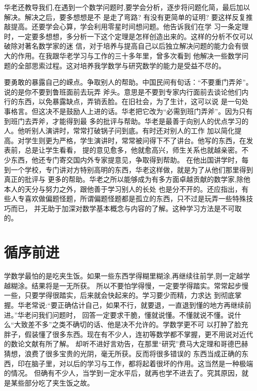 \documentclass[twoside,openright,headings=optiontohead]{ctexbook} %
\begin{document}
{华老还教导我们,在遇到一个数学问题时,要学会分析，逐步将问题化简，最后加以解决。解决之后，要多想想是不
是走了弯路? 有没有更简单的证明? 要这样反复推敲提高。还要学会心算，学会利用零星时间想问题。他告诉我们在学
习一条定理时，一定要多想想，多分析一下这个定理是怎样创造出来的。这样的分析不仅可以破除对著名数学家的迷
信，对于培养与提高自己以后独立解决问题的能力会有很大的作用。在我跟华老学习与工作的三十多年里，曾多次看到
他解决一些数学问题的全部思索过程。这对培养我学数学与研究数学的能力是受益不尽的。

要勇敢的暴露自己的嵘点。争取别人的帮助。中国民间有旬话：``不要重门弄斧''。说的是你不要到鲁班面前去玩弄
斧头。意思是不要到专家内行面前去谈论他们内行的东西，以免暴露缺点，弄销丢脸。在旧社会，为了生计，这可以说
是一句处事格言。但这决不是鼓励人上进的话。华老把它改为``必需到班门弄斧''。因为只有到班门去弄斧，才能得到最
多的批评与帮助。华老是最善于向别人的优点学习的人。他听别人演讲时，常常打破锅子问到底。有时还对别人的工作
加以简化提高。对学生则更为严格，学生演讲时，常常被问得下不了讲台。他写的东西，在发表前，总是让学生看看，
提的意见愈多，他就愈高兴，师生关系也就越亲密。不少东西，他还专门寄交国内外专家提意见，争取得到帮助。
在他出国讲学时，每到一个学校，专门讲对方特别高明的东西，华老这样做，就是为了从他们那里得到真正的批评与
更多的帮助。华老之所以能够成为有多方面卓越贡献的数学家,除他本人的天分与努力之外，跟他善于学习别人的长处
也是分不开的。还应指出，有些人专喜欢做偏题怪题，所谓偏题怪题都是孤立的东西，只不过是玩弄一些特殊技巧而已，
并无助于加深对数学基本概念与内容的了解。这种学习方法是不可取的。

\hypertarget{ux5faaux5e8fux524dux8fdb}{%
\section*{循序前进}\label{ux5faaux5e8fux524dux8fdb}}

学数学最怕的是吃夹生饭。如果一些东西学得糊里糊涂,再继续往前学,则一定越学越糊涂。结果将是一无所获。
所以不要怕学得慢，一定要学得踏实。常常起步慢一些，只要学得很踏实，后来就会快起来的。学习要少而精，力求达
到彻底掌握。华老常说:``要正确估计自己，如果不行，就要退，一直退到懂的地方再继续前进。''华老问我们问题时，
回答一定要求干脆，懂就说懂。不懂就说不懂。说什么``大致差不多''之类不确切的话、他是决不允许的。学数学更不可
以打肿了脸充胖子，假装懂了很多东西。现在有不少人，连初等数学都不掌握，更不用说对近代的数论文献有所了解。
却听不进好言劝告，在那里``研究''费马大定理和哥德巴赫猜想，浪费了很多宝贵的光阴，毫无所获。反而将很多错误的
东西当成正确的东西，印在脑子里，对以后的学习与工作，都将起着很坏的作用。这当然是一种极端的情况。
但确有不少人，当学到一定水平后，就再也学不进去了。究其原因，就是某些部分吃了夹生饭之故。

}
\end{document}
